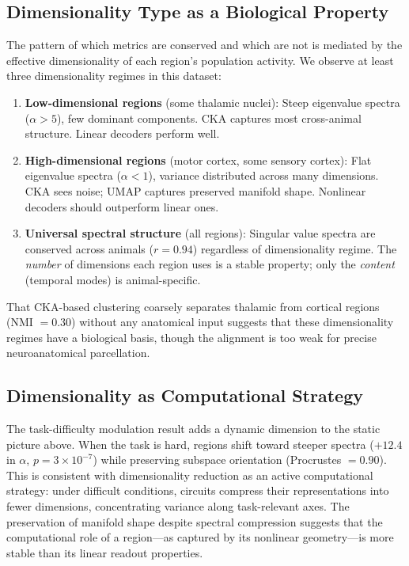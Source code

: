 \documentclass{article}
\begin{document}
\subsection{Dimensionality Type as a Biological Property}

The pattern of which metrics are conserved and which are not is mediated by the effective dimensionality of each region's population activity. We observe at least three dimensionality regimes in this dataset:

\begin{enumerate}
\item \textbf{Low-dimensional regions} (some thalamic nuclei): Steep eigenvalue spectra ($\alpha > 5$), few dominant components. CKA captures most cross-animal structure. Linear decoders perform well.
\item \textbf{High-dimensional regions} (motor cortex, some sensory cortex): Flat eigenvalue spectra ($\alpha < 1$), variance distributed across many dimensions. CKA sees noise; UMAP captures preserved manifold shape. Nonlinear decoders should outperform linear ones.
\item \textbf{Universal spectral structure} (all regions): Singular value spectra are conserved across animals ($r = 0.94$) regardless of dimensionality regime. The \emph{number} of dimensions each region uses is a stable property; only the \emph{content} (temporal modes) is animal-specific.
\end{enumerate}

That CKA-based clustering coarsely separates thalamic from cortical regions (NMI $= 0.30$) without any anatomical input suggests that these dimensionality regimes have a biological basis, though the alignment is too weak for precise neuroanatomical parcellation.

\subsection{Dimensionality as Computational Strategy}

The task-difficulty modulation result adds a dynamic dimension to the static picture above. When the task is hard, regions shift toward steeper spectra ($+12.4$ in $\alpha$, $p = 3 \times 10^{-7}$) while preserving subspace orientation (Procrustes $= 0.90$). This is consistent with dimensionality reduction as an active computational strategy: under difficult conditions, circuits compress their representations into fewer dimensions, concentrating variance along task-relevant axes. The preservation of manifold shape despite spectral compression suggests that the computational role of a region---as captured by its nonlinear geometry---is more stable than its linear readout properties.
\end{document}
